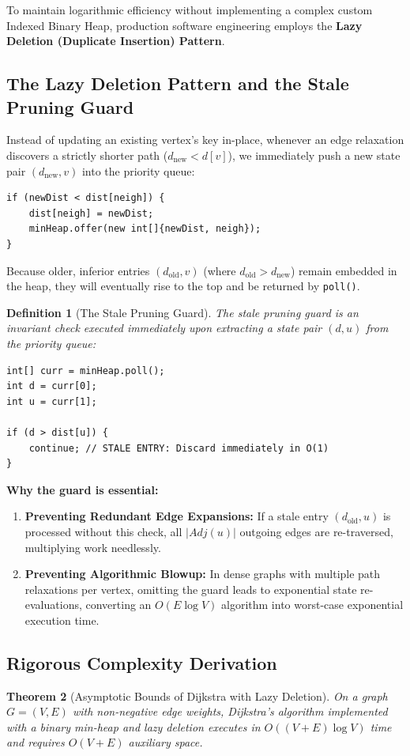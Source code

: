 \documentclass[10pt,journal,compsoc,onecolumn]{IEEEtran}
\newtheorem{theorem}{Theorem}
\newtheorem{definition}[theorem]{Definition}
\begin{document}
To maintain logarithmic efficiency without implementing a complex custom Indexed Binary Heap, production software engineering employs the \textbf{Lazy Deletion (Duplicate Insertion) Pattern}.

\subsection{The Lazy Deletion Pattern and the Stale Pruning Guard}
Instead of updating an existing vertex's key in-place, whenever an edge relaxation discovers a strictly shorter path ($d_{\text{new}} < d[v]$), we immediately push a new state pair $(d_{\text{new}}, v)$ into the priority queue:
\begin{lstlisting}
if (newDist < dist[neigh]) {
    dist[neigh] = newDist;
    minHeap.offer(new int[]{newDist, neigh});
}
\end{lstlisting}
Because older, inferior entries $(d_{\text{old}}, v)$ (where $d_{\text{old}} > d_{\text{new}}$) remain embedded in the heap, they will eventually rise to the top and be returned by \texttt{poll()}.

\begin{definition}[The Stale Pruning Guard]
The stale pruning guard is an invariant check executed immediately upon extracting a state pair $(d, u)$ from the priority queue:
\begin{lstlisting}
int[] curr = minHeap.poll();
int d = curr[0];
int u = curr[1];

if (d > dist[u]) {
    continue; // STALE ENTRY: Discard immediately in O(1)
}
\end{lstlisting}
\end{definition}

\textbf{Why the guard is essential:}
\begin{enumerate}
    \item \textbf{Preventing Redundant Edge Expansions:} If a stale entry $(d_{\text{old}}, u)$ is processed without this check, all $|Adj(u)|$ outgoing edges are re-traversed, multiplying work needlessly.
    \item \textbf{Preventing Algorithmic Blowup:} In dense graphs with multiple path relaxations per vertex, omitting the guard leads to exponential state re-evaluations, converting an $O(E \log V)$ algorithm into worst-case exponential execution time.
\end{enumerate}

\subsection{Rigorous Complexity Derivation}
\begin{theorem}[Asymptotic Bounds of Dijkstra with Lazy Deletion]
On a graph $G = (V, E)$ with non-negative edge weights, Dijkstra's algorithm implemented with a binary min-heap and lazy deletion executes in $O((V + E) \log V)$ time and requires $O(V + E)$ auxiliary space.
\end{theorem}
\end{document}
